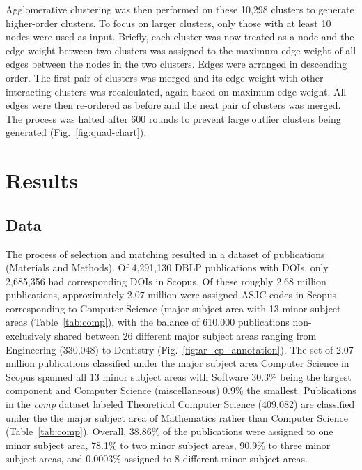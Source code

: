 Agglomerative clustering was then performed on these 10,298 clusters to generate higher-order clusters. To focus on larger clusters, only those with at least 10 nodes were used as input. Briefly, each cluster was now treated as a node and the edge weight between two clusters was assigned to the maximum edge weight of all edges between the nodes in the two clusters. Edges were arranged in descending order. The first pair of clusters was merged and its edge weight with other interacting clusters was recalculated, again based on maximum edge weight. All edges were then re-ordered as before and the next pair of clusters was merged. The process was halted after 600 rounds to prevent large outlier clusters being generated (Fig.~\ref{fig:quad-chart}).

\section*{Results}
\label{sec:results}


\subsection{Data}
The process of selection and matching resulted in a dataset of  publications (Materials and Methods). Of 4,291,130 DBLP publications with DOIs, only  2,685,356 had corresponding DOIs in Scopus. Of these roughly 2.68 million publications, approximately 2.07 million were assigned ASJC codes in Scopus corresponding to Computer Science (major subject area with 13 minor subject areas (Table~\ref{tab:comp}), with the balance of 610,000 publications non-exclusively shared between 26 different major subject areas ranging from Engineering (330,048) to Dentistry (Fig.~\ref{fig:ar_cp_annotation}). The set of 2.07 million publications classified under the major subject area Computer Science in Scopus spanned all 13 minor subject areas with Software 30.3\% being the largest component and Computer Science (miscellaneous) 0.9\% the smallest. Publications in the \emph{comp} dataset labeled Theoretical Computer Science (409,082) are classified under the the major subject area of Mathematics rather than Computer Science (Table~\ref{tab:comp}). Overall, 38.86\% of the publications were assigned to one minor subject area, 78.1\% to two minor subject areas, 90.9\% to three minor subject areas, and 0.0003\% assigned to 8 different minor subject areas. 


